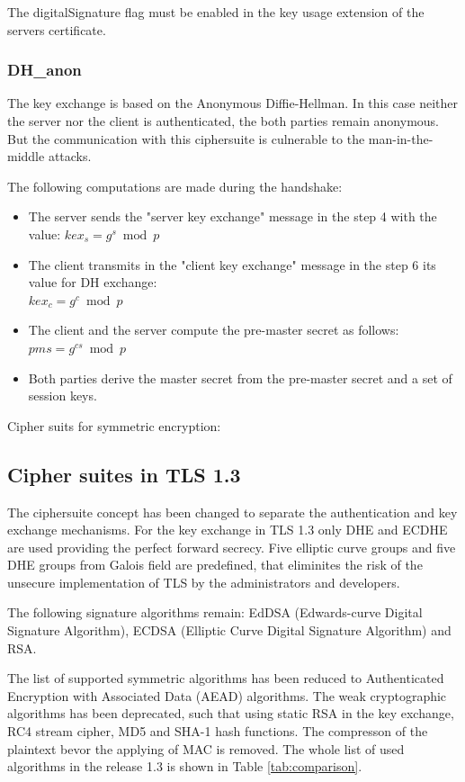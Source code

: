 The digitalSignature flag must be enabled in the key usage extension of the servers certificate.

\subsubsection*{DH\_anon}
The key exchange is based on the Anonymous Diffie-Hellman. In this case neither the server nor the client is authenticated, the both parties remain anonymous. But the communication with this ciphersuite is culnerable to the man-in-the-middle attacks.

The following computations are made during the handshake:
\begin{itemize}
	\item The server sends the "server key exchange" message in the step 4 with the value: $\displaystyle kex_s = g^s \bmod p $ 
	\item The client transmits in the "client key exchange" message in the step 6 its value for DH exchange: \\ $\displaystyle kex_c = g^c \bmod p $ 
	\item The client and the server compute the pre-master secret as follows: $\displaystyle pms = g^{cs} \bmod p$
	\item Both parties derive the master secret from the pre-master secret and a set of session keys.
\end{itemize}


Cipher suits for symmetric encryption:



\subsection{Cipher suites in TLS 1.3}
\label{subsec:ciphersuits1_3}

The ciphersuite concept has been changed to separate the authentication and key exchange mechanisms.
For the key exchange in TLS 1.3 only DHE and ECDHE are used providing the perfect forward secrecy. Five elliptic curve groups and five DHE groups from Galois field are predefined, that eliminites the risk of the unsecure implementation of TLS by the administrators and developers.

The following signature algorithms remain: EdDSA (Edwards-curve Digital Signature Algorithm),
ECDSA (Elliptic Curve Digital Signature Algorithm) and RSA.

The list of supported symmetric algorithms has been reduced to Authenticated Encryption with Associated Data (AEAD) algorithms.
The weak cryptographic algorithms has been deprecated, such that using static RSA in the key exchange, RC4 stream cipher, MD5 and SHA-1 hash functions. The compresson of the plaintext bevor the applying of MAC is removed.
The whole list of used algorithms in the release 1.3 is shown in Table \ref{tab:comparison}.

